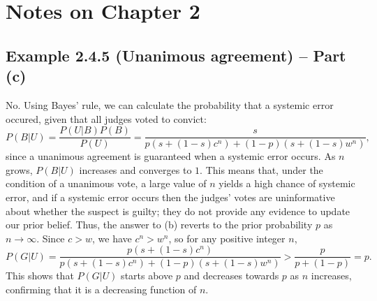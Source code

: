\section{Notes on Chapter 2}
\subsection{Example 2.4.5 (Unanimous agreement) -- Part (c)}
No. 
Using Bayes' rule, we can calculate the probability that a systemic error occured, given that all judges voted to convict: 
\begin{equation*}
    P(B|U) = \frac{P(U|B)P(B)}{P(U)} = \frac{s}{p(s+(1-s)c^n) + (1-p)(s+(1-s)w^n)}, 
\end{equation*}
since a unanimous agreement is guaranteed when a systemic error occurs. 
As $n$ grows, $P(B|U)$ increases and converges to $1$. 
This means that, under the condition of a unanimous vote, a large value of $n$ yields a high chance of systemic error, and if a systemic error occurs then the judges' votes are uninformative about whether the suspect is guilty; they do not provide any evidence to update our prior belief. 
Thus, the answer to (b) reverts to the prior probability $p$ as $n \to \infty$. 
Since $c > w$, we have $c^n > w^n$, so for any positive integer $n$, 
\begin{equation*}
    P(G|U) = \frac{p(s+(1-s)c^n)}{p(s+(1-s)c^n)+(1-p)(s+(1-s)w^n)} > \frac{p}{p+(1-p)} = p. 
\end{equation*}
This shows that $P(G|U)$ starts above $p$ and decreases towards $p$ as $n$ increases, confirming that it is a decreasing function of $n$. 




